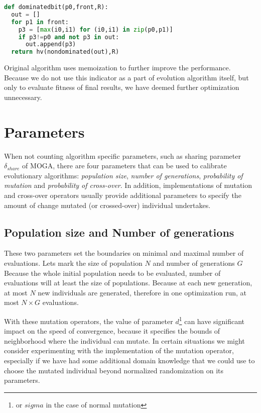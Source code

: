 \documentclass[12pt,oneside]{fithesis2}
\begin{document}
\begin{lstlisting}[language=Python,label=eps_example,caption=Calculation of intersecting hypervolumes]
def dominatedbit(p0,front,R):
  out = []
  for p1 in front:
    p3 = [max(i0,i1) for (i0,i1) in zip(p0,p1)]
    if p3!=p0 and not p3 in out:
      out.append(p3)
  return hv(nondominated(out),R)
\end{lstlisting}

Original algorithm\cite{russo2012quick} uses memoization to further improve the performance. Because we do not use this indicator as a part of evolution algorithm itself, but only to evaluate fitness of final results, we have deemed further optimization unnecessary. 

\section{Parameters}

When not counting algorithm specific parameters, such as sharing parameter $\delta_{share}$ of MOGA, there are four parameters that can be used to calibrate evolutionary algorithms: \emph{population size}, \emph{number of generations}, \emph{probability of mutation} and \emph{probability of cross-over}. In addition, implementations of mutation and cross-over operators usually provide additional parameters to specify the amount of change mutated (or crossed-over) individual undertakes.

\subsection{Population size and Number of generations}
These two parameters set the boundaries on minimal and maximal number of evaluations. Lets mark the size of population $N$ and number of generations $G$ Because the whole initial population needs to be evaluated, number of evaluations will at least the size of populations.
Because at each new generation, at most $N$ new individuals are generated, therefore in one optimization run, at most $N \times G$ evaluations.


With these mutation operators, the value of parameter $d$\footnote{or $sigma$ in the case of normal mutation} can have significant impact on the speed of convergence, because it specifies the bounds of neighborhood where the individual can mutate. In certain situations we might consider experimenting with the implementation of the mutation operator, especially if we have had some additional domain knowledge that we could use to choose the mutated individual beyond normalized randomization on its parameters.
\end{document}
